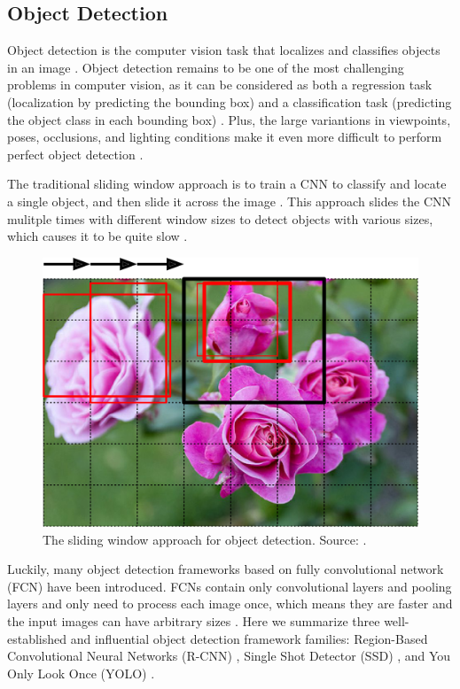 \documentclass[a4paper,11pt,oneside]{article}
\begin{document}
  \subsection{Object Detection}

  \label{sec:14}

  Object detection is the computer vision task that localizes and classifies objects in an image
  \cite{elgendy2020deep, zhao2019object, liu2020deep, geron2019hands}. Object detection remains to be one of the most
  challenging problems in computer vision, as it can be considered as both a regression task (localization by predicting
  the bounding box) and a classification task (predicting the object class in each bounding box)
  \cite{elgendy2020deep, girshick2014rich, geron2019hands}. Plus, the large variantions in viewpoints, poses, occlusions,
  and lighting conditions make it even more difficult to perform perfect object detection
  \cite{zhao2019object, liu2020deep}.

  The traditional sliding window approach is to train a CNN to classify and locate a single object, and then slide it
  across the image \cite{geron2019hands, pasquet2017amphora, girshick2014rich, redmon2016you}. This approach slides the
  CNN mulitple times with different window sizes to detect objects with various sizes, which causes it to be quite slow
  \cite{geron2019hands}.

  \begin{figure}[ht]
    \begin{center}
      \includegraphics[width=.8\textwidth]{sliding_window.png}
    \end{center}
    \caption{The sliding window approach for object detection. Source: \cite{o2019deep}.}
  \end{figure}

  Luckily, many object detection frameworks based on fully convolutional network (FCN) \cite{long2015fully} have been
  introduced. FCNs contain only convolutional layers and pooling layers and only need to process each image once, which
  means they are faster and the input images can have arbitrary sizes \cite{elgendy2020deep, geron2019hands, long2015fully}.
  Here we summarize three well-established and influential object detection framework families: Region-Based Convolutional
  Neural Networks (R-CNN) \cite{girshick2014rich, girshick2015fast, ren2015faster}, Single Shot Detector (SSD)
  \cite{liu2016ssd}, and You Only Look Once (YOLO)
  \cite{redmon2016you, redmon2017yolo9000, redmon2018yolov3, bochkovskiy2020yolov4, yolov5}.
\end{document}
